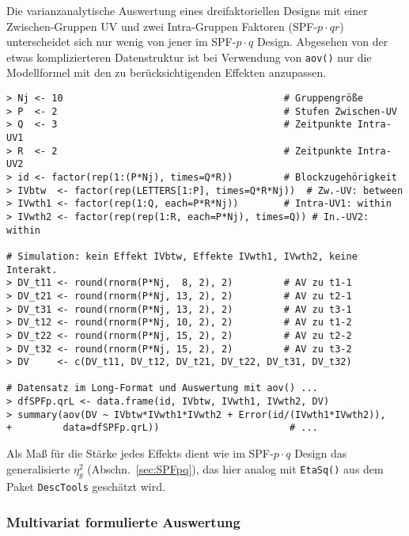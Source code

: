 Die varianzanalytische Auswertung eines dreifaktoriellen Designs mit einer Zwischen-Gruppen UV und zwei Intra-Gruppen Faktoren (SPF-$p \cdot qr$) unterscheidet sich nur wenig von jener im SPF-$p \cdot q$ Design. Abgesehen von der etwas komplizierteren Datenstruktur ist bei Verwendung von \lstinline!aov()! nur die Modellformel mit den zu berücksichtigenden Effekten anzupassen.
\begin{lstlisting}
> Nj <- 10                                       # Gruppengröße
> P  <- 2                                        # Stufen Zwischen-UV
> Q  <- 3                                        # Zeitpunkte Intra-UV1
> R  <- 2                                        # Zeitpunkte Intra-UV2
> id <- factor(rep(1:(P*Nj), times=Q*R))         # Blockzugehörigkeit
> IVbtw  <- factor(rep(LETTERS[1:P], times=Q*R*Nj))  # Zw.-UV: between
> IVwth1 <- factor(rep(1:Q, each=P*R*Nj))        # Intra-UV1: within
> IVwth2 <- factor(rep(rep(1:R, each=P*Nj), times=Q)) # In.-UV2: within

# Simulation: kein Effekt IVbtw, Effekte IVwth1, IVwth2, keine Interakt.
> DV_t11 <- round(rnorm(P*Nj,  8, 2), 2)         # AV zu t1-1
> DV_t21 <- round(rnorm(P*Nj, 13, 2), 2)         # AV zu t2-1
> DV_t31 <- round(rnorm(P*Nj, 13, 2), 2)         # AV zu t3-1
> DV_t12 <- round(rnorm(P*Nj, 10, 2), 2)         # AV zu t1-2
> DV_t22 <- round(rnorm(P*Nj, 15, 2), 2)         # AV zu t2-2
> DV_t32 <- round(rnorm(P*Nj, 15, 2), 2)         # AV zu t3-2
> DV     <- c(DV_t11, DV_t12, DV_t21, DV_t22, DV_t31, DV_t32)

# Datensatz im Long-Format und Auswertung mit aov() ...
> dfSPFp.qrL <- data.frame(id, IVbtw, IVwth1, IVwth2, DV)
> summary(aov(DV ~ IVbtw*IVwth1*IVwth2 + Error(id/(IVwth1*IVwth2)),
+         data=dfSPFp.qrL))                       # ...
\end{lstlisting}

Als Maß für die Stärke jedes Effekts dient wie im SPF-$p \cdot q$ Design das generalisierte $\eta_{g}^{2}$ (Abschn.\ \ref{sec:SPFpq}), das hier analog mit \lstinline!EtaSq()! aus dem Paket \lstinline!DescTools! geschätzt wird.

\subsubsection{Multivariat formulierte Auswertung}

